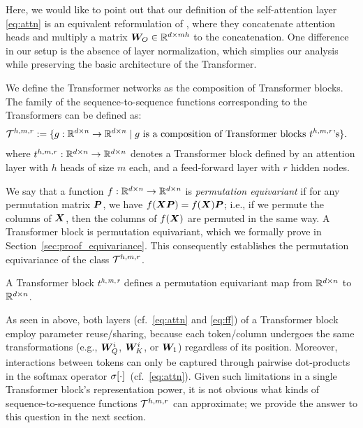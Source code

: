 Here, we would like to point out that our definition of the self-attention layer \eqref{eq:attn} is an equivalent reformulation of \citep{vaswani2017attention}, where they concatenate attention heads and multiply a matrix ${\bm{W}}_O \in \mathbb{R}^{d \times mh}$ to the concatenation.
One difference in our setup is the absence of layer normalization, which simplies our analysis while preserving the basic architecture of the Transformer.


We define the Transformer networks as the composition of Transformer blocks. The family of the sequence-to-sequence functions corresponding to the Transformers can be defined as:
\begin{align*}
    \mathcal{T}^{h,m,r} 
    &:= 
    \{ g: \mathbb{R}^{d \times n} \to \mathbb{R}^{d \times n} \mid 
    \text{$g$ is a composition of Transformer blocks $t^{h,m,r}$'s} \}.
\end{align*}
where $t^{h,m,r}:\mathbb{R}^{d \times n} \to \mathbb{R}^{d \times n}$ denotes a Transformer block defined by an attention layer with $h$ heads of size $m$ each, and a feed-forward layer with $r$ hidden nodes. 

We say that a function $f : \mathbb{R}^{d \times n} \to \mathbb{R}^{d \times n}$ is {\em permutation equivariant} if for any permutation matrix ${\bm{P}}$, we have $f({\bm{X}} {\bm{P}}) = f({\bm{X}}) {\bm{P}}$; i.e., if we permute the columns of ${\bm{X}}$, then the columns of $f({\bm{X}})$ are permuted in the same way. A Transformer block is permutation equivariant, which we formally prove in Section~\ref{sec:proof_equivariance}. This consequently establishes the permutation equivariance of the class $\mathcal{T}^{h,m,r}$. 
\begin{claim}
\label{claim:equivariance}
A Transformer block $t^{h, m, r}$ defines a permutation equivariant map from $\mathbb{R}^{d \times n}$ to $\mathbb{R}^{d \times n}$.
\end{claim}

As seen in above, both layers (cf.~\eqref{eq:attn} and \eqref{eq:ff}) of a Transformer block employ parameter reuse/sharing, because each token/column undergoes the same transformations (e.g., ${\bm{W}}_Q^i$, ${\bm{W}}_K^i$, or ${\bm{W}}_1$) regardless of its position.
Moreover, interactions between tokens can only be captured through pairwise dot-products in the softmax operator $\sigma[\cdot]$~(cf.~\eqref{eq:attn}).
Given such limitations in a single Transformer block's representation power, it is not obvious what kinds of sequence-to-sequence functions $\mathcal{T}^{h,m,r}$ can approximate; we provide the answer to this question in the next section.

